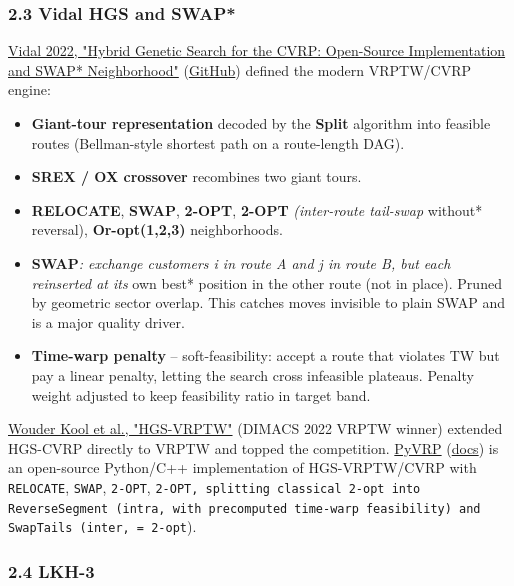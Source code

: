 \documentclass[twocolumn,10pt,letterpaper]{article}
\begin{document}
\subsubsection{2.3 Vidal HGS and SWAP*}

\href{https://arxiv.org/abs/2012.10384}{Vidal 2022, "Hybrid Genetic Search for the CVRP: Open-Source Implementation and SWAP* Neighborhood"} (\href{https://github.com/vidalt/HGS-CVRP}{GitHub}) defined the modern VRPTW/CVRP engine:


\begin{itemize}
\setlength{\itemsep}{0pt}
\setlength{\parskip}{0pt}
  \item \textbf{Giant-tour representation} decoded by the \textbf{Split} algorithm into feasible routes (Bellman-style shortest path on a route-length DAG).
  \item \textbf{SREX / OX crossover} recombines two giant tours.
  \item \textbf{RELOCATE}, \textbf{SWAP}, \textbf{2-OPT}, \textbf{2-OPT}\textit{ (inter-route tail-swap }without* reversal), \textbf{Or-opt(1,2,3)} neighborhoods.
  \item \textbf{SWAP}\textit{: exchange customers i in route A and j in route B, but each reinserted at its }own best* position in the other route (not in place). Pruned by geometric sector overlap. This catches moves invisible to plain SWAP and is a major quality driver.
  \item \textbf{Time-warp penalty} -- soft-feasibility: accept a route that violates TW but pay a linear penalty, letting the search cross infeasible plateaus. Penalty weight adjusted to keep feasibility ratio in target band.
\end{itemize}

\href{https://wouterkool.github.io/pdf/paper-kool-hgs-vrptw.pdf}{Wouder Kool et al., "HGS-VRPTW"} (DIMACS 2022 VRPTW winner) extended HGS-CVRP directly to VRPTW and topped the competition. \href{https://arxiv.org/pdf/2403.13795}{PyVRP} (\href{https://pyvrp.org/}{docs}) is an open-source Python/C++ implementation of HGS-VRPTW/CVRP with \texttt{RELOCATE}, \texttt{SWAP}, \texttt{2-\allowbreak OPT}, \texttt{2-\allowbreak OPT\textit{}, splitting classical 2-opt into \texttt{ReverseSegment} (intra, with precomputed time-warp feasibility) and \texttt{SwapTails} (inter, = 2-opt}).


\subsubsection{2.4 LKH-3}
\end{document}

